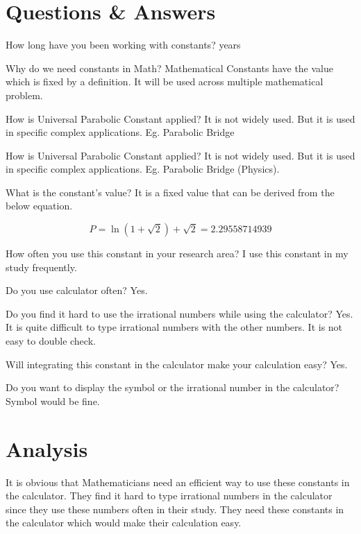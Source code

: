 \documentclass{report}
\begin{document}
\section{Questions \& Answers}
\begin{qanda}
 
\Q How long have you been working with constants?
 years

\Q Why do we need constants in Math?
\A Mathematical Constants have the value which is fixed by a definition. It will be used across multiple mathematical problem.

\Q How is Universal Parabolic Constant applied?
\A It is not widely used. But it is used in specific complex applications. Eg. Parabolic Bridge


\Q How is Universal Parabolic Constant applied?
\A It is not widely used. But it is used in specific complex applications. Eg. Parabolic Bridge (Physics).

\Q What is the constant's value?
\A It is a fixed value that can be derived from the below equation.

\begin{equation}
P = \ln(1+\sqrt{2})+\sqrt{2} = 2.29558714939
\end{equation}

\Q How often you use this constant in your research area?
\A I use this constant in my study frequently.

\Q Do you use calculator often?
\A Yes.

\Q Do you find it hard to use the irrational numbers while using the calculator? 
\A Yes. It is quite difficult to type irrational numbers with the other numbers. It is not easy to double check.

\Q  Will integrating this constant in the calculator make your calculation easy? 
\A Yes. 

\Q  Do you want to display the symbol or the irrational number in the calculator?
\A  Symbol would be fine.






\section{Analysis}

It is obvious that Mathematicians need an efficient way to use these constants in the calculator. They find it hard to type irrational numbers in the calculator since they use these numbers often in their study. They need these constants in the calculator which would make their calculation easy. 



\end{qanda}








\end{document}
